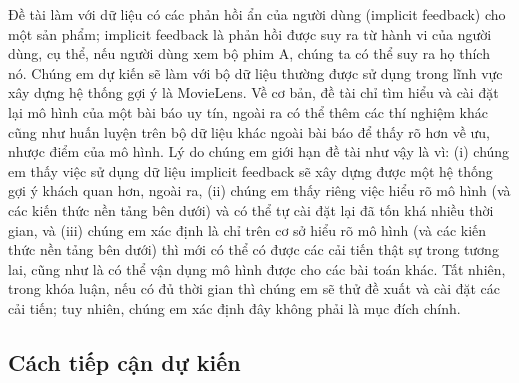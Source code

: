 \documentclass{article}[14pt]
\begin{document}
{    %
    Đề tài làm với dữ liệu có các phản hồi ẩn của người dùng (implicit feedback) 
    cho một sản phẩm; implicit feedback là phản hồi được suy ra từ hành vi của người dùng, 
    cụ thể, nếu người dùng xem bộ phim A, chúng ta có thể suy ra họ thích nó. 
    Chúng em dự kiến sẽ làm với bộ dữ liệu thường được sử 
    dụng trong lĩnh vực xây dựng  hệ thống gợi ý là MovieLens.
    Về cơ bản, đề tài chỉ tìm hiểu và cài đặt lại mô hình của một bài báo uy 
tín, ngoài ra có thể thêm các thí nghiệm khác cũng như huấn luyện trên 
bộ dữ liệu khác ngoài bài báo để thấy rõ hơn về ưu, nhược điểm của mô 
hình.
    Lý do chúng em giới hạn đề tài như vậy là vì: (i) chúng em thấy việc sử dụng 
    dữ liệu implicit feedback sẽ xây dựng được một hệ thống gợi ý khách quan hơn, 
     ngoài ra, (ii) chúng em thấy riêng 
việc hiểu rõ mô hình (và các kiến thức nền tảng bên dưới) và có thể tự 
cài đặt lại đã tốn khá nhiều thời gian, và (iii) chúng em xác định là chỉ 
trên cơ sở hiểu rõ mô hình (và các kiến thức nền tảng bên dưới) thì mới 
có thể có được các cải tiến thật sự trong tương lai, cũng như là có thể 
vận dụng mô hình được cho các bài toán khác.
    Tất nhiên, trong khóa luận, nếu có đủ thời gian thì chúng em sẽ thử đề 
xuất và cài đặt các cải tiến; tuy nhiên, chúng em xác định đây không 
phải là mục đích chính.
    
    \subsection{Cách tiếp cận dự kiến}
    

}
\end{document}

